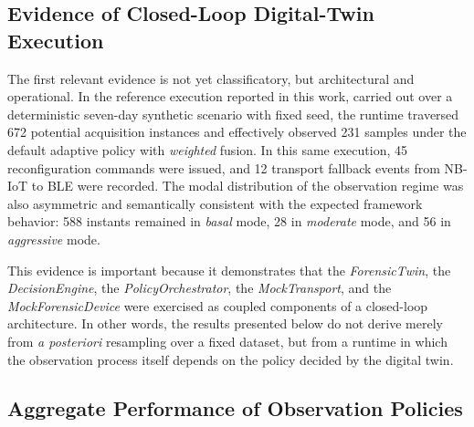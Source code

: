 \documentclass[journal]{IEEEtran}
\begin{document}
\subsection{Evidence of Closed-Loop Digital-Twin Execution}
The first relevant evidence is not yet classificatory, but architectural and operational. In the reference execution reported in this work, carried out over a deterministic seven-day synthetic scenario with fixed seed, the runtime traversed 672 potential acquisition instances and effectively observed 231 samples under the default adaptive policy with \textit{weighted} fusion. In this same execution, 45 reconfiguration commands were issued, and 12 transport fallback events from NB-IoT to BLE were recorded. The modal distribution of the observation regime was also asymmetric and semantically consistent with the expected framework behavior: 588 instants remained in \textit{basal} mode, 28 in \textit{moderate} mode, and 56 in \textit{aggressive} mode.

This evidence is important because it demonstrates that the \textit{ForensicTwin}, the \textit{DecisionEngine}, the \textit{PolicyOrchestrator}, the \textit{MockTransport}, and the \textit{MockForensicDevice} were exercised as coupled components of a closed-loop architecture. In other words, the results presented below do not derive merely from \textit{a posteriori} resampling over a fixed dataset, but from a runtime in which the observation process itself depends on the policy decided by the digital twin.


\subsection{Aggregate Performance of Observation Policies}

\end{document}
